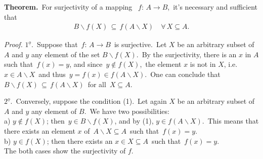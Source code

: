 \documentclass[12pt]{article}
\theoremstyle{definition}
\begin{document}
\textbf{Theorem.}\, For surjectivity of a mapping \, $f\!:\,A \to B$,\, it's necessary and sufficient that
\begin{align}
B\!\smallsetminus\!f(X) \,\subseteq\, f(A\!\smallsetminus\!X) \quad \forall\, X \subseteq A.
\end{align}


{\em Proof.}\; $1^{\underline{o}}$.\, Suppose that\, $f\!:\,A \to B$\, is surjective.\, Let $X$ be an arbitrary subset of $A$ and $y$ any element of the set $B\!\smallsetminus\!f(X)$.\, By the surjectivity, there is an $x$ in $A$ such that\, $f(x) = y$, and since\, $y \notin f(X)$,\, the element $x$ is not in $X$, i.e.\, $x \in A\!\smallsetminus\!X$\, and thus\, $y = f(x) \in f(A\!\smallsetminus\!X)$.\, One can conclude that\, $B\!\smallsetminus\!f(X) \,\subseteq\, f(A\!\smallsetminus\!X)$\, for all\, $X \subseteq A$.

$2^{\underline{o}}$.\, Conversely, suppose the condition (1).\, Let again $X$ be an arbitrary subset of $A$ and $y$ any element of $B$.\, We have two possibilities:\\
a) $y \notin f(X)$; then\, $y \in B\!\smallsetminus\!f(X)$, and by (1), $y \in f(A\!\smallsetminus\!X)$.\, This means that there exists an element $x$ of\, $A\!\smallsetminus\!X \subseteq A$\, such that\, $f(x) = y$.\\
b) $y \in f(X)$; then there exists an $x \in X \subseteq A$\, such that\, $f(x) = y$.\\
The both cases show the surjectivity of $f$.
\end{document}
